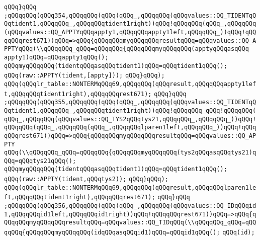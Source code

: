 \verb|qQQq}qQQq|\newline
\verb|;qQQqqQQq(qQQq354,qQQqqQQq(qQQq(qQQq_,qQQqqQQq(qQQqvalues::QQ_TIDENTqQQqtident1,qQQqqQQq_,qQQqqQQqtident1right))qQQq!qQQqqQQq(qQQq_,qQQqqQQq(qQQqvalues::QQ_APPTYqQQqappty1,qQQqqQQqappty1left,qQQqqQQq_))qQQq!qQQqqQQqrest671))qQQq=>qQQq{qQQqqQQqmyqQQqqQQqresultqQQq=qQQqvalues::QQ_APPTYqQQq(\\qQQqqQQq_qQQq=qQQqqQQq{qQQqqQQqmyqQQqqQQq(apptyqQQqasqQQq|\newline
\verb|appty1)qQQq=qQQqappty1qQQq();|\newline
\verb|qQQqmyqQQqqQQq(tidentqQQqasqQQqtident1)qQQq=qQQqtident1qQQq();|\newline
\verb|qQQq(raw::APPTY(tident,[appty]));|\newline
\verb|qQQq}qQQq);|\newline
\verb|qQQq(qQQqlr_table::NONTERMqQQq69,qQQqqQQq(qQQqresult,qQQqqQQqappty1left,qQQqqQQqtident1right),qQQqqQQqrest671);|\newline
\verb|qQQq}qQQq|\newline
\verb|;qQQqqQQq(qQQq355,qQQqqQQq(qQQq(qQQq_,qQQqqQQq(qQQqvalues::QQ_TIDENTqQQqtident1,qQQqqQQq_,qQQqqQQqtident1right))qQQq!qQQqqQQq_qQQq!qQQqqQQq(qQQq_,qQQqqQQq(qQQqvalues::QQ_TYS2qQQqtys21,qQQqqQQq_,qQQqqQQq_))qQQq!qQQqqQQq(qQQq_,qQQqqQQq(qQQq_,qQQqqQQqlparen1left,qQQqqQQq_))qQQq!qQQqqQQqrest671))qQQq=>qQQq{qQQqqQQqmyqQQqqQQqresultqQQq=qQQqvalues::QQ_APPTY|\newline
\verb|qQQq(\\qQQqqQQq_qQQq=qQQqqQQq{qQQqqQQqmyqQQqqQQq(tys2qQQqasqQQqtys21)qQQq=qQQqtys21qQQq();|\newline
\verb|qQQqmyqQQqqQQq(tidentqQQqasqQQqtident1)qQQq=qQQqtident1qQQq();|\newline
\verb|qQQq(raw::APPTY(tident,qQQqtys2));|\newline
\verb|qQQq}qQQq);|\newline
\verb|qQQq(qQQqlr_table::NONTERMqQQq69,qQQqqQQq(qQQqresult,qQQqqQQqlparen1left,qQQqqQQqtident1right),qQQqqQQqrest671);|\newline
\verb|qQQq}qQQq|\newline
\verb|;qQQqqQQq(qQQq356,qQQqqQQq(qQQq(qQQq_,qQQqqQQq(qQQqvalues::QQ_IDqQQqid1,qQQqqQQqid1left,qQQqqQQqid1right))qQQq!qQQqqQQqrest671))qQQq=>qQQq{qQQqqQQqmyqQQqqQQqresultqQQq=qQQqvalues::QQ_TIDqQQq(\\qQQqqQQq_qQQq=qQQqqQQq{qQQqqQQqmyqQQqqQQq(idqQQqasqQQqid1)qQQq=qQQqid1qQQq();|\newline
\verb|qQQq(id);|\newline

